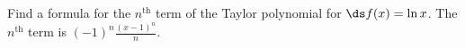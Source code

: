 {Find a formula for the $n^\text{th}$ term of the Taylor polynomial for $\ds f(x)=\ln x$.
}
{The $n^\text{th}$ term is $(-1)^n\frac{(x-1)^n}{n}$.
}